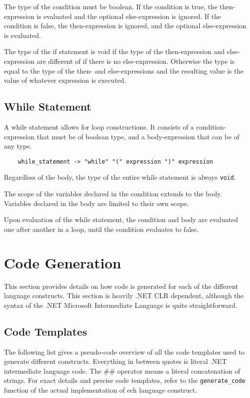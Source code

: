 \documentclass{report}
\begin{document}
The type of the condition must be boolean. If the condition is true,
the then-expression is evaluated and the optional else-expression is
ignored. If the condition is false, the then-expression is ignored,
and the optional else-expression is evaluated.

The type of the if statement is void if the type of the
then-expression and else-expression are different of if there is no
else-expression. Otherwise the type is equal to the type of the
then- and else-expressions and the resulting value is the value of
whatever expression is executed.

\section{While Statement}

A while statement allows for loop constructions. It consists of a
condition-expression that must be of boolean type, and a
body-expression that can be of any type.

\begin{verbatim}
    while_statement -> "while" "(" expression ")" expression
\end{verbatim}

Regardless of the body, the type of the entire while statement is
always \texttt{void}.

The scope of the variables declared in the condition extends to the
body. Variables declared in the body are limited to their own scope.

Upon evaluation of the while statement, the condition and body are
evaluated one after another in a loop, until the condition evaluates
to false.

\chapter{Code Generation}

This section provides details on how code is generated for each of
the different language constructs. This section is heavily .NET CLR
dependent, although the syntax of the .NET Microsoft Intermediate
Language is quite straightforward.

\section{Code Templates}

The following list gives a pseudo-code overview of all the code
templates used to generate different constructs. Everything in
between quotes is literal .NET intermediate language code. The \#\#
operator means a literal concatenation of strings. For exact details
and precise code templates, refer to the \texttt{generate\_code}
function of the actual implementation of ech language construct.
\end{document}
